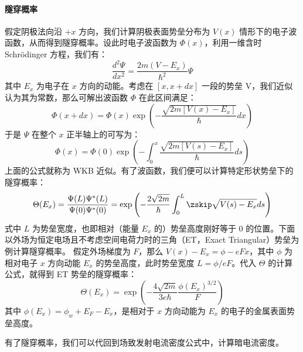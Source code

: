\paragraph{隧穿概率}
	假定阴极法向沿 $+x$ 方向，我们计算阴极表面势垒分布为 $V(x)$ 情形下的电子波函数，从而得到隧穿概率。设此时电子波函数为 $\Phi(x)$，利用一维含时 Schr\"odinger 方程，我们有：
	\[\frac{d^2\Psi}{dx^2}=\frac{2m(V-E_x)}{\hbar^2}\Psi\]
	其中 $E_x$ 为电子在 $x$ 方向的动能。考虑在 $[x, x+dx]$ 一段的势垒 V，我们近似认为其为常数，那么可解出波函数 $\Phi$ 在此区间满足：
	\[\Phi(x+dx)=\Phi(x)\exp\left(-\frac{\sqrt{2m[V(x)-E_x]}}{\hbar}dx\right)\]
	于是 $\Psi$ 在整个 $x$ 正半轴上的可写为：
	\[\Phi(x)=\Phi(0)\exp\left(-\int_0^x\frac{\sqrt{2m[V(s)-E_x]}}{\hbar}ds\right)\]
	上面的公式就称为 WKB 近似。有了波函数，我们便可以计算特定形状势垒下的隧穿概率：
	\[\Theta(E_x)=\frac{\Psi(L)\Psi^*(L)}{\Psi(0)\Psi^*(0)}=\exp\left(-\frac{2\sqrt{2m}}{\hbar}\int_0^L\zskip\sqrt{V(s)-E_x}ds\right)\]
	式中 $L$ 为势垒宽度，也即相对（能量 $E_x$ 的）势垒高度刚好等于 0 的位置。下面以外场为恒定电场且不考虑空间电荷力时的三角（ET，Exact Triangular）势垒为例计算隧穿概率。
	假定外场梯度为 $F$，那么 $V(x)-E_x=\phi-eFx$，其中 $\phi$ 为相对电子 $x$ 方向动能 $E_x$ 的势垒高度，此时势垒宽度 $L=\phi/eF$。代入 $\Theta$ 的计算公式，就得到 ET 势垒的隧穿概率：
	\begin{equation}
	\Theta(E_x)=\exp\left(-\frac{4\sqrt{2m}}{3e\hbar}\frac{\phi(E_x)^{3/2}}{F}\right)
	\end{equation}
	其中 $\phi(E_x)=\phi_w+E_F-E_x$，是相对于 $x$ 方向动能为 $E_x$ 的电子的金属表面势垒高度。
	
	有了隧穿概率，我们可以代回到场致发射电流密度公式中，计算暗电流密度。

